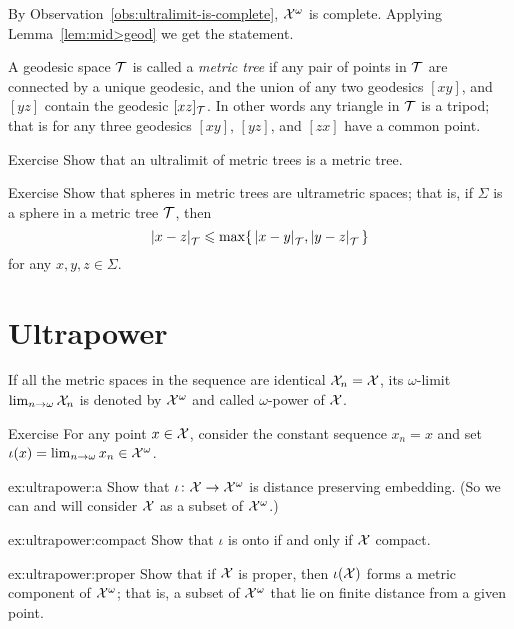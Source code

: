 By Observation~\ref{obs:ultralimit-is-complete}, $\mathcal{X}^\omega$ is complete.
Applying Lemma~\ref{lem:mid>geod} we get the statement.
\qeds

A geodesic space $\mathcal{T}$ is called a \emph{metric tree} if any pair of points in $\mathcal{T}$ are connected by a unique geodesic,
and the union of any two geodesics $[xy]$, and $[yz]$ contain the geodesic $[xz]_{\mathcal{T}}$.
In other words any triangle in $\mathcal{T}$ is a tripod;
that is for any three geodesics $[xy]$, $[yz]$, and $[zx]$ have a common point.

\begin{thm}{Exercise}\label{ex:lim(tree)}
Show that an ultralimit of metric trees is a metric tree. 
\end{thm}

\begin{thm}{Exercise}
Show that spheres in metric trees are ultrametric spaces;
that is, if $\Sigma$ is a sphere in a metric tree $\mathcal{T}$, then
\[\dist{x}{z}{\spc{T}}
\le
\max\{\,\dist{x}{y}{\spc{T}},\dist{y}{z}{\spc{T}}\,\}\]
for any $x,y,z\in\Sigma$.
\end{thm}



\section{Ultrapower}

If all the metric spaces in the sequence are identical $\mathcal{X}_n=\mathcal{X}$, 
its $\omega$-limit 
$\lim_{n\to\omega}\mathcal{X}_n$
is denoted by $\mathcal{X}^\omega$
and called $\omega$-power of $\mathcal{X}$.



\begin{thm}{Exercise}\label{ex:ultrapower}
For any point $x\in \mathcal{X}$, consider the constant sequence $x_n=x$
and set $\iota(x)=\lim_{n\to\omega}x_n\in\mathcal{X}^\omega$.

\begin{subthm}{ex:ultrapower:a}
Show that $\iota\colon\mathcal{X}\to\mathcal{X}^\omega$ is distance preserving embedding. (So we can and will consider $\mathcal{X}$ as a subset of $\mathcal{X}^\omega$.)
\end{subthm}

\begin{subthm}{ex:ultrapower:compact} 
Show that $\iota$ is onto if and only if $\mathcal{X}$ compact.
\end{subthm}

\begin{subthm}{ex:ultrapower:proper} 
Show that if $\mathcal{X}$ is proper, then $\iota(\mathcal{X})$ forms a metric component of $\mathcal{X}^\omega$; that is, a subset of $\mathcal{X}^\omega$ that lie on finite distance from a given point.
\end{subthm}

\end{thm}

